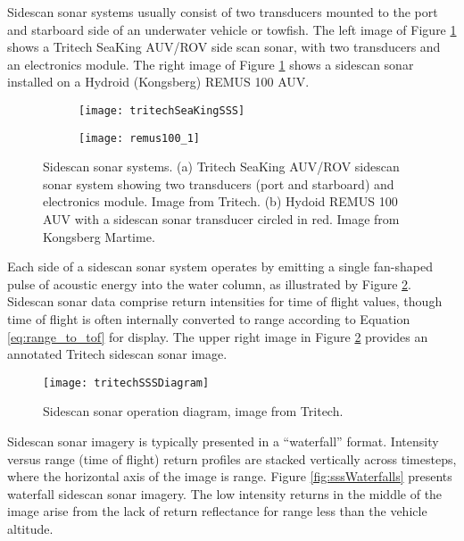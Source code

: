 Sidescan sonar systems usually consist of two transducers mounted to the port and starboard side of an underwater vehicle or towfish.
The left image of Figure \ref{fig:sss} shows a Tritech SeaKing AUV/ROV side scan sonar, with two transducers and an electronics module.
The right image of Figure \ref{fig:sss} shows a sidescan sonar installed on a Hydroid (Kongsberg) REMUS 100 AUV.

\begin{figure}[!h]
	\centering
	\begin{subfigure}[b]{0.3\textwidth}
                \texttt{[image: tritechSeaKingSSS]}
                \caption{}
  \end{subfigure}
  \centering
	\begin{subfigure}[b]{0.69\textwidth}
                \texttt{[image: remus100\_1]}
                \caption{}
  \end{subfigure}
	\caption{\small Sidescan sonar systems. (a) Tritech SeaKing AUV/ROV sidescan sonar system showing two transducers (port and starboard) and electronics module.  Image from Tritech. (b) Hydoid REMUS 100 AUV with a sidescan sonar transducer circled in red.  Image from Kongsberg Martime. }	
	\label{fig:sss}
\end{figure}


Each side of a sidescan sonar system operates by emitting a single fan-shaped pulse of acoustic energy into the water column, as illustrated by Figure \ref{fig:ssDiagram}.  
Sidescan sonar data comprise return intensities for time of flight values, though time of flight is often internally converted to range according to Equation \ref{eq:range_to_tof} for display.
The upper right image in Figure \ref{fig:ssDiagram} provides an annotated Tritech sidescan sonar image.

\begin{figure} [h!]
	\centering
	\texttt{[image: tritechSSSDiagram]}
	\caption{Sidescan sonar operation diagram, image from Tritech.}
	\label{fig:ssDiagram}
\end{figure}

Sidescan sonar imagery is typically presented in a ``waterfall'' format.  
Intensity versus range (time of flight) return profiles are stacked vertically across timesteps, where the horizontal axis of the image is range.
Figure \ref{fig:sssWaterfalls} presents waterfall sidescan sonar imagery. 
The low intensity returns in the middle of the image arise from the lack of return reflectance for range less than the vehicle altitude.

